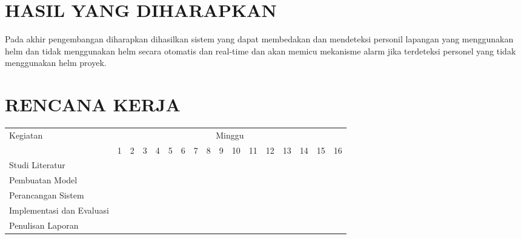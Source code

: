 \section{HASIL YANG DIHARAPKAN}

Pada akhir pengembangan diharapkan dihasilkan sistem yang dapat membedakan dan mendeteksi personil lapangan yang menggunakan helm dan tidak menggunakan helm secara otomatis dan real-time dan akan
memicu mekanisme alarm jika terdeteksi personel yang tidak menggunakan helm proyek.


\section{RENCANA KERJA}

\newcommand{\w}{}
\newcommand{\G}{\cellcolor{gray}}
\begin{table}[h!]
  \begin{tabular}{|p{3.5cm}|c|c|c|c|c|c|c|c|c|c|c|c|c|c|c|c|}

    \hline
    \multirow{2}{*}{Kegiatan} & \multicolumn{16}{|c|}{Minggu} \\
    \cline{2-17} &
    1 & 2 & 3 & 4 & 5 & 6 & 7 & 8 & 9 & 10 & 11 & 12 & 13 & 14 & 15 & 16 \\
    \hline

    Studi Literatur &
    \G & \G & \G & \G & \G & \w & \w & \w & \w & \w & \w & \w & \w & \w & \w & \w \\
    \hline

    Pembuatan Model &
    \w & \w & \w & \G & \G & \G & \G & \G & \w & \w & \w & \w & \w & \w & \w & \w \\
    \hline

    Perancangan Sistem &
    \w & \w & \w & \w & \w & \w & \G & \G & \G & \G & \G & \w & \w & \w & \w & \w \\
    \hline

    Implementasi dan Evaluasi &
    \w & \w & \w & \w & \w & \w & \w & \w & \w & \w & \w & \G & \w & \w & \w & \w \\
    \hline
    
    Penulisan Laporan &
    \w & \w & \w & \w & \w & \w & \w & \w & \w & \w & \w & \w & \G & \G & \G & \G \\
    \hline

  \end{tabular}
\end{table}